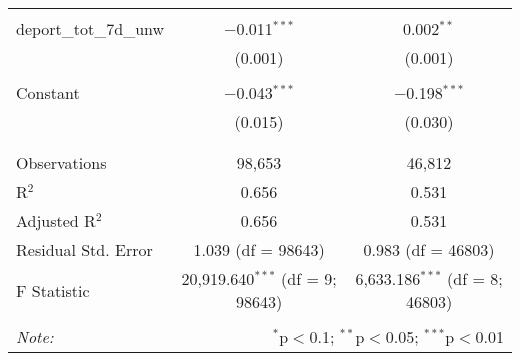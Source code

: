 \begin{table}[!htbp]
\begin{tabular}{@{\extracolsep{5pt}}lcc}
  & & \\ 
 deport\_tot\_7d\_unw & $-$0.011$^{***}$ & 0.002$^{**}$ \\ 
  & (0.001) & (0.001) \\ 
  & & \\ 
 Constant & $-$0.043$^{***}$ & $-$0.198$^{***}$ \\ 
  & (0.015) & (0.030) \\ 
  & & \\ 
\hline \\[-1.8ex] 
Observations & 98,653 & 46,812 \\ 
R$^{2}$ & 0.656 & 0.531 \\ 
Adjusted R$^{2}$ & 0.656 & 0.531 \\ 
Residual Std. Error & 1.039 (df = 98643) & 0.983 (df = 46803) \\ 
F Statistic & 20,919.640$^{***}$ (df = 9; 98643) & 6,633.186$^{***}$ (df = 8; 46803) \\ 
\hline 
\hline \\[-1.8ex] 
\textit{Note:}  & \multicolumn{2}{r}{$^{*}$p$<$0.1; $^{**}$p$<$0.05; $^{***}$p$<$0.01} \\ 
\end{tabular} 
\end{table} 
